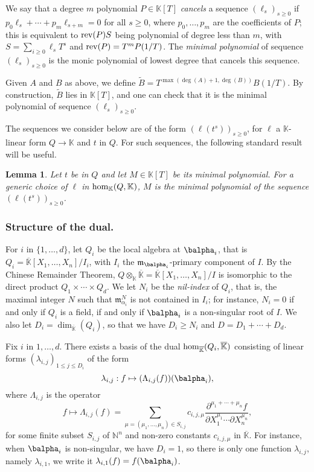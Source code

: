 \documentclass[12pt]{article}
\def\N {\ensuremath{\mathbb{N}}}
\def\K {\ensuremath{\mathbb{K}}}
\def\Kbar {{\ensuremath{\overline{\mathbb{K}}}}}
\def\D {\ensuremath{D}}
\def\m {\ensuremath{\mathfrak{m}}}
\newtheorem{Lemma}{Lemma}
\begin{document}
We say that a degree $m$ polynomial $P\in\K[T]$ {\em cancels} a
sequence $(\ell_s)_{s \ge 0}$ if $p_0 \ell_s + \cdots + p_m
\ell_{s+m}=0$ for all $s \ge 0$, where $p_0,\dots,p_m$ are the
coefficients of $P$; this is equivalent to ${\rm rev}(P) S$ being
polynomial of degree less than $m$, with $S=\sum_{i \ge 0} \ell_s T^s$
and ${\rm rev}(P)=T^m P(1/T)$. The {\em minimal polynomial} of
sequence $(\ell_s)_{s \ge 0}$ is the monic polynomial of lowest degree
that cancels this sequence.

Given $A$ and $B$ as above, we define $\tilde B =
T^{\max(\deg(A)+1,\deg(B))}B(1/T)$.  By construction, $\tilde B$ lies
in $\K[T]$, and one can check that it is the minimal polynomial of
sequence $(\ell_s)_{s \ge 0}$.

The sequences we consider below are of the form $(\ell(t^s))_{s \ge
  0}$, for $\ell$ a $\K$-linear form $Q \to \K$ and $t$ in $Q$. For such
sequences, the following standard result will be useful.
\begin{Lemma}\label{lemma:minpoly}
  Let $t$ be in $Q$ and let $M \in \K[T]$ be its minimal
  polynomial. For a generic choice of $\ell$ in ${\rm hom}_\K(Q,\K)$,
  $M$ is the minimal polynomial of the sequence $(\ell(t^s))_{s \ge
    0}$.
\end{Lemma}





\subsubsection{Structure of the dual.}
For $i$ in $\{1,\dots,d\}$, let $Q_i$ be the local algebra at
$\balpha_i$, that is $Q_i=\Kbar[X_1,\dots,X_n]/I_i$, with $I_i$ the
$\m_{\balpha_i}$-primary component of $I$. By the Chinese Remainder
Theorem, $Q\otimes_\K \Kbar=\Kbar[X_1,\dots,X_n]/I$ is isomorphic to
the direct product $Q_1\times \cdots \times Q_d$.  We let $N_i$ be the
{\em nil-index} of $Q_i$, that is, the maximal integer $N$ such that
$\m_{\alpha_i}^N$ is not contained in $I_i$; for instance, $N_i=0$ if
and only if $Q_i$ is a field, if and only if $\balpha_i$ is a
non-singular root of $I$. We also let
$\D_i=\dim_\Kbar(Q_i)$, so that we have $D_i \ge N_i$ and $\D=\D_1 + \cdots + \D_d$.

Fix $i$ in $1,\dots,d$.  There exists a basis of the dual ${\rm
  hom}_\Kbar(Q_i,\Kbar)$ consisting of linear forms
$(\lambda_{i,j})_{1\le j \le \D_i}$ of the form
$$\lambda_{i,j}: f \mapsto (\Lambda_{i,j}(f))(\balpha_i),$$
where $\Lambda_{i,j}$ is the operator
$$f \mapsto \Lambda_{i,j}(f) = \sum_{\mu=(\mu_1,\dots,\mu_n) \in
  S_{i,j}} c_{i,j,\mu} \frac{ \partial^{\mu_1 + \cdots + \mu_n} f}
{\partial X_1^{\mu_1} \cdots \partial X_n^{\mu_n}},$$ for some finite
subset $S_{i,j}$ of $\N^n$ and non-zero constants $c_{i,j,\mu}$ in
$\Kbar$. 
For instance, when $\balpha_i$ is non-singular, we have $D_i=1$, so
there is only one function $\lambda_{i,j}$, namely $\lambda_{i,1}$, we
write it $\lambda_{i,1}(f) = f(\balpha_i)$.
\end{document}
